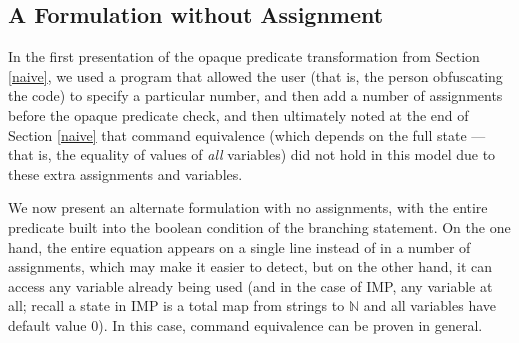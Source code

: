 \documentclass[compsoc,conference,a4paper,10pt,times]{IEEEtran}
\newtheorem{defin}[theorem]{Definition}
\begin{document}

%

\subsection{A Formulation without Assignment}\label{noass}
In the first presentation of the opaque predicate transformation from Section \ref{naive}, we used a program that allowed
the user (that is, the person obfuscating the code) to specify a particular number, and then add a number of assignments before the
opaque predicate check, and then ultimately noted at the end of Section \ref{naive} that command equivalence (which depends on the full state --- that is, the equality of values of \emph{all} variables) did not
hold in this model due to these extra assignments and variables.
\par
We now present an alternate formulation with no assignments, with the entire predicate
built into the boolean condition of the branching statement. On the one hand, the entire
equation appears on a single line instead of in a number of assignments, which may make it
easier to detect, but on the other hand, it can access any variable already being used (and
in the case of IMP, any variable at all; recall a state in IMP is a total map
from strings to $\mathbb{N}$ and all variables have default value 0).  In this case, command equivalence can be proven in general.
\end{document}
